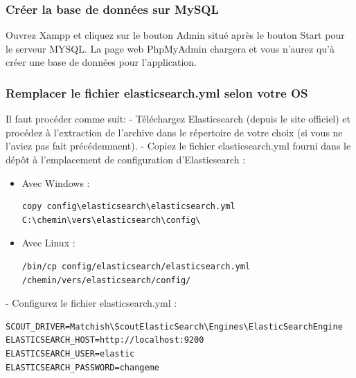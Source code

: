 \documentclass[12pt]{article}
\begin{document}
\subsubsection{Créer la base de données sur MySQL}
Ouvrez Xampp et cliquez sur le bouton Admin situé après le bouton Start pour le serveur MYSQL. La page web PhpMyAdmin  chargera et vous n'aurez qu'à créer une base de données pour l'application.   
\bigskip 

\subsubsection{Remplacer le fichier elasticsearch.yml selon votre OS} 
Il faut procéder comme suit:
\smallskip
\newline
- Téléchargez Elasticsearch (depuis le site officiel) et procédez à l'extraction de l'archive dans le répertoire de votre choix (si vous ne l'aviez pas fait précédemment).
\newline
- Copiez le fichier elasticsearch.yml fourni dans le dépôt à l'emplacement de configuration d'Elasticsearch : 
\medskip
        \begin{itemize}
            \item  Avec Windows :
            \begin{lstlisting}
copy config\elasticsearch\elasticsearch.yml C:\chemin\vers\elasticsearch\config\
            \end{lstlisting}
\newpage
            \item Avec Linux :
            \begin{lstlisting}
/bin/cp config/elasticsearch/elasticsearch.yml /chemin/vers/elasticsearch/config/
            \end{lstlisting}
        \end{itemize}
\bigskip

- Configurez le fichier elasticsearch.yml :
\medskip
    \begin{lstlisting}
SCOUT_DRIVER=Matchish\ScoutElasticSearch\Engines\ElasticSearchEngine
ELASTICSEARCH_HOST=http://localhost:9200
ELASTICSEARCH_USER=elastic
ELASTICSEARCH_PASSWORD=changeme
    \end{lstlisting}
\end{document}
